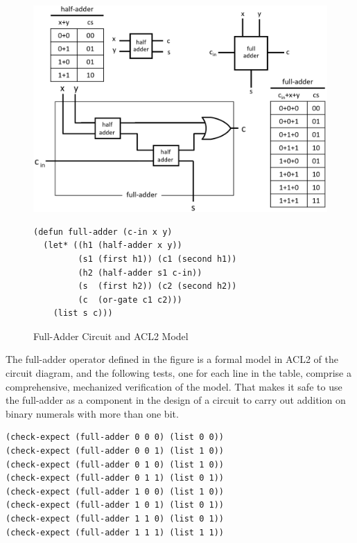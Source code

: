 \begin{figure}
\begin{center}
\includegraphics[scale=0.25]{Images/full-adder.png}
\begin{Verbatim}
(defun full-adder (c-in x y)
  (let* ((h1 (half-adder x y))
         (s1 (first h1)) (c1 (second h1))
         (h2 (half-adder s1 c-in))
         (s  (first h2)) (c2 (second h2))
         (c  (or-gate c1 c2)))
    (list s c)))
\end{Verbatim}
\end{center}
\caption{Full-Adder Circuit and ACL2 Model}
\label{fig:full-adder}
\end{figure}

The full-adder operator defined in the figure
is a formal model in ACL2 of the circuit diagram,
and the following tests, one for each line in the table,
comprise a comprehensive, mechanized verification of
the model.
That makes it safe to use the full-adder as a component
in the design of a circuit to carry out addition on binary numerals
with more than one bit.

\label{full-adder-model-check}
\begin{Verbatim}
(check-expect (full-adder 0 0 0) (list 0 0))
(check-expect (full-adder 0 0 1) (list 1 0))
(check-expect (full-adder 0 1 0) (list 1 0))
(check-expect (full-adder 0 1 1) (list 0 1))
(check-expect (full-adder 1 0 0) (list 1 0))
(check-expect (full-adder 1 0 1) (list 0 1))
(check-expect (full-adder 1 1 0) (list 0 1))
(check-expect (full-adder 1 1 1) (list 1 1))
\end{Verbatim}

